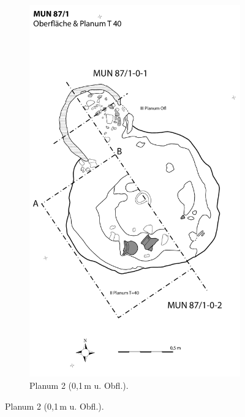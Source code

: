 \begin{figure}[p]
	\centering
	\begin{minipage}[b]{.3\textwidth}
		\begin{subfigure}[t]{\textwidth}
			\centering
			\includegraphics[width = \textwidth]{fig/MUN87-1_3Pl_T40Profil_A.pdf}
			\caption{Planum 2 (0,1\,m u. Obfl.).}
			\label{fig:MUN87-1_3Pl_T40Profil_A}
		\end{subfigure}
	\end{minipage}\hspace{1em}

\end{figure}

